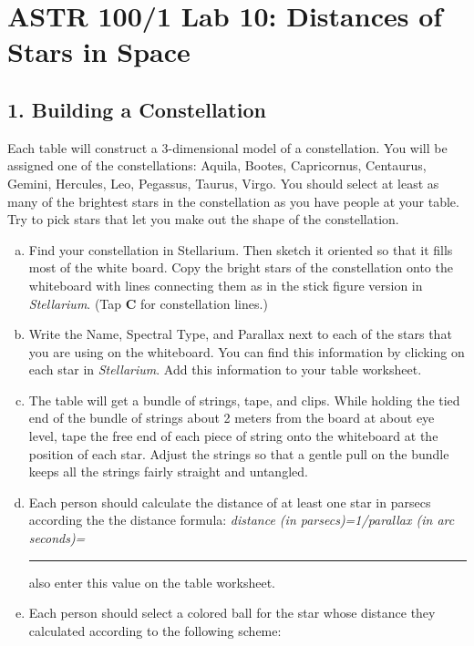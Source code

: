 \documentclass[main.tex]{subfiles}
\begin{document}
\section*{ASTR 100/1 Lab 10: Distances of Stars in Space}
\subsection*{1. Building a Constellation}
Each table will construct a 3-dimensional model of a constellation. You will be assigned one of the constellations: Aquila, Bootes, Capricornus, Centaurus, Gemini, Hercules, Leo, Pegassus, Taurus, Virgo. You should select at least as many of the brightest stars in the constellation as you have people at your table. Try to pick stars that let you make out the shape of the constellation. 
\begin{enumerate} [a.]
    \item Find your constellation in Stellarium. Then sketch it oriented so that it fills most of the white board. Copy the bright stars of the constellation onto the whiteboard with lines connecting them as in the stick figure version in \textit{Stellarium}. (Tap \textbf{C} for constellation lines.)
    \item Write the Name, Spectral Type, and Parallax next to each of the stars that you are using on the whiteboard. You can find this information by clicking on each star in \textit{Stellarium}. Add this information to your table worksheet. 
    \item The table will get a bundle of strings, tape, and clips. While holding the tied end of the bundle of strings about 2 meters from the board at about eye level, tape the free end of each piece of string onto the whiteboard at the position of each star. Adjust the strings so that a gentle pull on the bundle keeps all the strings fairly straight and untangled.
    \item Each person should calculate the distance of at least one star in parsecs according the the distance formula:
    \newline
    \newline
\textit{distance (in parsecs)=1/parallax (in arc seconds)=} \rule{2cm}{.15mm}
\newline
\newline
also enter this value on the table worksheet.
\item Each person should select a colored ball for the star whose distance they calculated according to the following scheme:
\newline

\end{enumerate}
\end{document}
